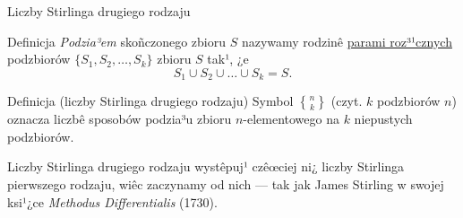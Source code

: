 \documentclass[a4paper,10pt]{beamer}
\begin{document}
\begin{frame}{Liczby Stirlinga drugiego rodzaju}

\begin{block}{Definicja}
{\it Podzia³em} skoñczonego zbioru $S$ nazywamy rodzinê \underline{parami roz³¹cznych} podzbiorów $\{S_1,S_2,\ldots,S_k\}$ zbioru $S$ tak¹, ¿e $$S_1\cup S_2\cup\ldots\cup S_k=S.$$
\end{block}

\bigskip

\begin{block}{Definicja (liczby Stirlinga drugiego rodzaju)}
Symbol ${n\brace k}$ (czyt. $k$ podzbiorów $n$) oznacza liczbê sposobów podzia³u zbioru $n$-elementowego na $k$ niepustych podzbiorów.
\end{block}

\smallskip

\begin{small}Liczby Stirlinga drugiego rodzaju wystêpuj¹ czêœciej ni¿ liczby Stirlinga pierwszego rodzaju, wiêc zaczynamy od nich --- tak jak James Stirling w swojej ksi¹¿ce {\it Methodus Differentialis} (1730).\end{small}
\end{frame}


\begin{frame}
\end{frame}
\end{document}
